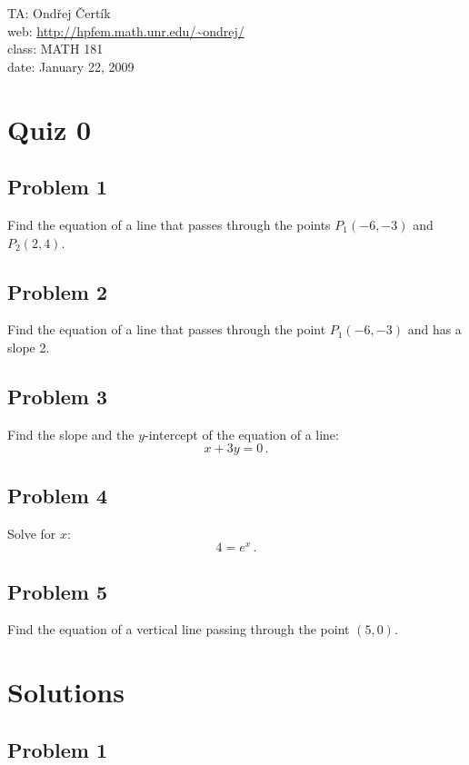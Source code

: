 \documentclass[10pt]{article}
\begin{document}
\noindent TA: Ondřej Čertík\\
web: \url{http://hpfem.math.unr.edu/~ondrej/}\\
class: MATH 181\\
date: January 22, 2009

\section*{Quiz 0}

\subsection*{Problem 1}

Find the equation of a line that passes through the points $P_1(-6, -3)$ and
$P_2(2, 4)$.

\subsection*{Problem 2}

Find the equation of a line that passes through the point $P_1(-6, -3)$ and has
a slope 2.

\subsection*{Problem 3}

Find the slope and the $y$-intercept of the equation of a line:
$$x+3y=0\,.$$

\subsection*{Problem 4}

Solve for $x$:
$$4=e^x\,.$$

\subsection*{Problem 5}

Find the equation of a vertical line passing through the point $(5, 0)$.

\section*{Solutions}

\subsection*{Problem 1}
\end{document}
